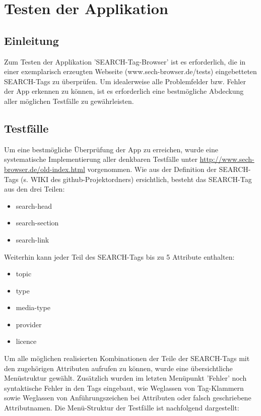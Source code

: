 \chapter{Testen der Applikation}

\section{Einleitung}

Zum Testen der Applikation 'SEARCH-Tag-Browser' ist es erforderlich, die in einer exemplarisch erzeugten Webseite (www.sech-browser.de/tests) eingebetteten SEARCH-Tags zu überprüfen. Um idealerweise alle Problemfelder bzw. Fehler der App erkennen zu können, ist es erforderlich eine bestmögliche Abdeckung aller möglichen Testfälle zu gewährleisten.  

\section{Testfälle} 

Um eine bestmögliche Überprüfung der App zu erreichen, wurde eine systematische Implementierung aller denkbaren Testfälle unter \url {http://www.sech-browser.de/old-index.html} vorgenommen. Wie aus der Definition der SEARCH-Tags (s. WIKI des github-Projektordners) ersichtlich, besteht das SEARCH-Tag aus den drei Teilen:

\begin {itemize} 
   \item search-head
   \item search-section
   \item search-link
\end {itemize}

Weiterhin kann jeder Teil des SEARCH-Tags bis zu 5 Attribute enthalten:

\begin {itemize}
   \item topic
   \item type
   \item media-type
   \item provider
   \item licence
\end {itemize}

Um alle möglichen realisierten Kombinationen der Teile der SEARCH-Tags mit den zugehörigen Attributen aufrufen zu können, wurde eine übersichtliche Menüstruktur gewählt. Zusätzlich wurden im letzten Menüpunkt 'Fehler' noch syntaktische Fehler in den Tags eingebaut, wie Weglassen von Tag-Klammern sowie Weglassen von Anführungszeichen bei Attributen oder falsch geschriebene Attributnamen.   
Die Menü-Struktur der Testfälle ist nachfolgend dargestellt:

